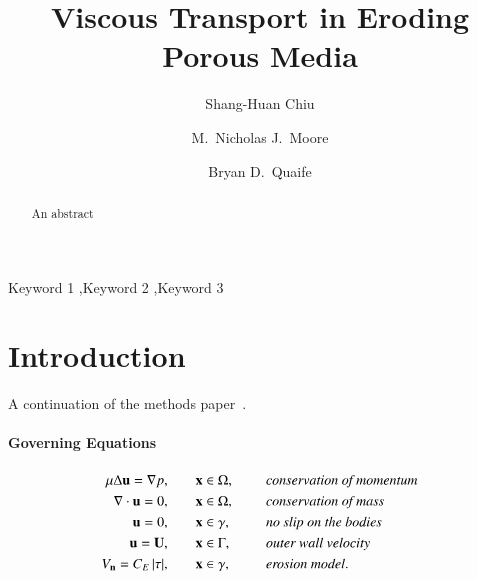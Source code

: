 \documentclass[preprint, 10pt]{elsarticle}
\begin{document}
\title{Viscous Transport in Eroding Porous Media}



\author[SH]{Shang-Huan Chiu}
\author[Nick]{M.~Nicholas J.~Moore}
\author[Bryan]{Bryan D.~Quaife}

\address[SH]{Department of Scientific Computing, Florida State
University, Tallahassee, FL, 32306.}
\address[Nick]{Department of Mathematics and Geophysical Fluid Dynamics Institute, Florida State University, Tallahassee, FL, 32306.}
\address[Bryan]{Department of Scientific Computing and Geophysical Fluid Dynamics Institute, Florida State University, Tallahassee, FL, 32306.}

\begin{abstract} 
  An abstract
\end{abstract}

\begin{keyword}
  Keyword 1 \sep Keyword 2 \sep Keyword 3 
\end{keyword}

\maketitle

\section{Introduction\label{s:intro}}
A continuation of the methods paper~\cite{qua-moo2018}.

\paragraph{Governing Equations}
\begin{equation}
\label{eqn:erosionModel}
\begin{split}
  \mu \Delta {\mathbf{u}} = {\nabla} p, &\hspace{20pt} {\mathbf{x}} \in \Omega, \hspace*{.2in} &&\mbox{\em conservation
of momentum}\\
{\nabla} \cdot {\mathbf{u}} = 0, &\hspace{20pt} {\mathbf{x}} \in \Omega, \hspace*{.2in} &&\mbox{\em conservation of mass} \\
{\mathbf{u}} = 0, &\hspace{20pt} {\mathbf{x}} \in \gamma, \hspace*{.2in} &&\mbox{\em no slip on the
bodies} \\
{\mathbf{u}} = {\mathbf{U}}, &\hspace{20pt} {\mathbf{x}} \in \Gamma, \hspace*{.2in} &&\mbox{\em outer wall
velocity} \\
V_{\mathbf{n}} = C_E \, \lvert \tau \rvert, &\hspace{20pt} {\mathbf{x}} \in \gamma,
&&\mbox{\em erosion model}.
\end{split}
\end{equation}
\end{document}
